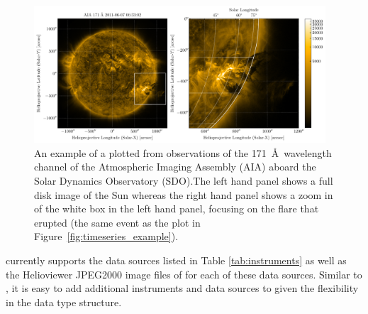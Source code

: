 \begin{figure}
    \centering
    \includegraphics[width=0.97\textwidth]{figures/map_example.pdf}
    \caption{An example of a \sunpypkg \Map plotted from observations of the 171~\AA\ wavelength channel of the Atmospheric Imaging Assembly (AIA) aboard the Solar Dynamics Observatory (SDO).The left hand panel shows a full disk image of the Sun whereas the right hand panel shows a zoom in of the white box in the left hand panel, focusing on the flare that erupted (the same event as the \Timeseries plot in Figure~\ref{fig:timeseries_example}).}
    \label{fig:map_example}
\end{figure}

\Map currently supports the data sources listed in Table \ref{tab:instruments} as well as the Helioviewer JPEG2000 image files of for each of these data sources. Similar to \Timeseries, it is easy to add additional instruments and data sources to \Map given the flexibility in the data type structure. 
